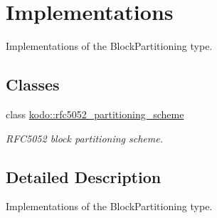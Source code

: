 \hypertarget{group__block__partitioning__implementation}{\section{Implementations}
\label{group__block__partitioning__implementation}
}


Implementations of the Block\-Partitioning type.  


\subsection*{Classes}
\begin{DoxyCompactItemize}
\item 
class \hyperlink{classkodo_1_1rfc5052__partitioning__scheme}{kodo\-::rfc5052\-\_\-partitioning\-\_\-scheme}
\begin{DoxyCompactList}\small\item\em R\-F\-C5052 block partitioning scheme. \end{DoxyCompactList}\end{DoxyCompactItemize}


\subsection{Detailed Description}
Implementations of the Block\-Partitioning type. 